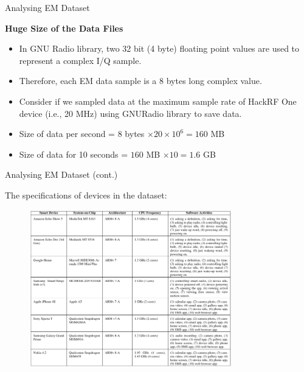 \documentclass[handout]{beamer}
\begin{document}
\begin{frame}{Analysing EM Dataset}  

\footnotesize
\textbf{Huge Size of the Data Files}
		\vspace{10pt}

	\begin{itemize}
	\item In GNU Radio library, two 32 bit (4 byte) floating point values are used to represent a complex I/Q sample.
		\vspace{10pt}
	\item Therefore, each EM data sample is a 8 bytes long complex value.
		\vspace{10pt}
	\item Consider if we sampled data at the maximum sample rate of HackRF One device (i.e., 20 MHz) using GNURadio library to save data.
		\vspace{10pt}
	\item Size of data per second = $8$ bytes $\times 20 \times 10^{6} = 160$ MB
		\vspace{10pt}
	\item Size of data for 10 seconds = $160$ MB $\times 10 = 1.6$ GB
	\end{itemize}

\end{frame}


\begin{frame}{Analysing EM Dataset (cont.)}  

\footnotesize
The specifications of devices in the dataset:
	

	\begin{figure}
		\includegraphics[width=250pt]{figures/device-spec-from-the-dataset.png}
	\end{figure}

\end{frame}
\end{document}
